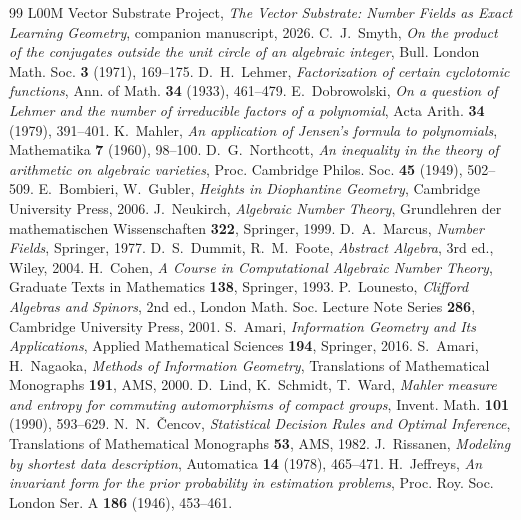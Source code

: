 \documentclass[11pt]{article}
\theoremstyle{plain}
\theoremstyle{definition}
\theoremstyle{remark}
\begin{document}
\begin{thebibliography}{99}
 L00M Vector Substrate Project, \emph{The Vector Substrate: Number Fields as Exact
  Learning Geometry}, companion manuscript, 2026.
 C.~J.~Smyth, \emph{On the product of the conjugates outside the unit circle of an algebraic
  integer}, Bull. London Math. Soc. \textbf{3} (1971), 169--175.
 D.~H.~Lehmer, \emph{Factorization of certain cyclotomic functions}, Ann. of Math.
  \textbf{34} (1933), 461--479.
 E.~Dobrowolski, \emph{On a question of Lehmer and the number of irreducible factors of
  a polynomial}, Acta Arith. \textbf{34} (1979), 391--401.
 K.~Mahler, \emph{An application of Jensen's formula to polynomials}, Mathematika
  \textbf{7} (1960), 98--100.
 D.~G.~Northcott, \emph{An inequality in the theory of arithmetic on algebraic varieties},
  Proc. Cambridge Philos. Soc. \textbf{45} (1949), 502--509.
 E.~Bombieri, W.~Gubler, \emph{Heights in Diophantine Geometry}, Cambridge
  University Press, 2006.
 J.~Neukirch, \emph{Algebraic Number Theory}, Grundlehren der mathematischen
  Wissenschaften \textbf{322}, Springer, 1999.
 D.~A.~Marcus, \emph{Number Fields}, Springer, 1977.
 D.~S.~Dummit, R.~M.~Foote, \emph{Abstract Algebra}, 3rd ed., Wiley, 2004.
 H.~Cohen, \emph{A Course in Computational Algebraic Number Theory}, Graduate Texts in
  Mathematics \textbf{138}, Springer, 1993.
 P.~Lounesto, \emph{Clifford Algebras and Spinors}, 2nd ed., London Math. Soc. Lecture
  Note Series \textbf{286}, Cambridge University Press, 2001.
 S.~Amari, \emph{Information Geometry and Its Applications}, Applied Mathematical Sciences
  \textbf{194}, Springer, 2016.
 S.~Amari, H.~Nagaoka, \emph{Methods of Information Geometry}, Translations of
  Mathematical Monographs \textbf{191}, AMS, 2000.
 D.~Lind, K.~Schmidt, T.~Ward, \emph{Mahler measure and entropy for commuting automorphisms of
  compact groups}, Invent. Math. \textbf{101} (1990), 593--629.
 N.~N.~\v{C}encov, \emph{Statistical Decision Rules and Optimal Inference}, Translations of
  Mathematical Monographs \textbf{53}, AMS, 1982.
 J.~Rissanen, \emph{Modeling by shortest data description}, Automatica \textbf{14}
  (1978), 465--471.
 H.~Jeffreys, \emph{An invariant form for the prior probability in estimation problems},
  Proc. Roy. Soc. London Ser. A \textbf{186} (1946), 453--461.
\end{thebibliography}
\end{document}
